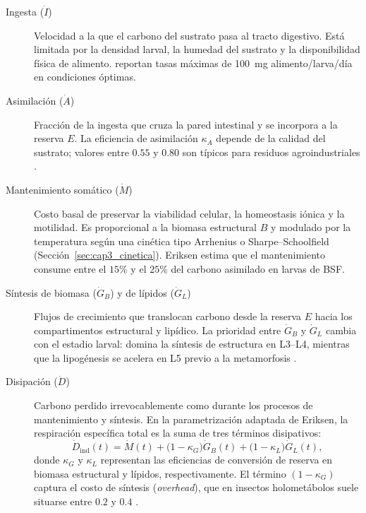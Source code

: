 \begin{description}
    \item[Ingesta ($\dot{I}$)] Velocidad a la que el carbono del sustrato pasa al tracto digestivo. Está limitada por la densidad larval, la humedad del sustrato y la disponibilidad física de alimento. \textcite{dienerConversionOrganicMaterial2011} reportan tasas máximas de 100~mg alimento/larva/día en condiciones óptimas.

    \item[Asimilación ($\dot{A}$)] Fracción de la ingesta que cruza la pared intestinal y se incorpora a la reserva $E$. La eficiencia de asimilación $\kappa_A$ depende de la calidad del sustrato; valores entre $0.55$ y $0.80$ son típicos para residuos agroindustriales \parencite{guillaumeAsymptoticEstimatedDigestibility2023}.

    \item[Mantenimiento somático ($\dot{M}$)] Costo basal de preservar la viabilidad celular, la homeostasis iónica y la motilidad. Es proporcional a la biomasa estructural $B$ y modulado por la temperatura según una cinética tipo Arrhenius o Sharpe--Schoolfield (Sección~\ref{sec:cap3_cinetica}). Eriksen estima que el mantenimiento consume entre el $15\%$ y el $25\%$ del carbono asimilado en larvas de BSF.

    \item[Síntesis de biomasa ($\dot{G}_B$) y de lípidos ($\dot{G}_L$)] Flujos de crecimiento que translocan carbono desde la reserva $E$ hacia los compartimentos estructural y lipídico. La prioridad entre $\dot{G}_B$ y $\dot{G}_L$ cambia con el estadio larval: domina la síntesis de estructura en L3--L4, mientras que la lipogénesis se acelera en L5 previo a la metamorfosis \parencite{eriksenDynamicModellingFeed2022,grausaMetabolicModelingHermetia2023}.

    \item[Disipación ($\dot{D}$)] Carbono perdido irrevocablemente como  durante los procesos de mantenimiento y síntesis. En la parametrización adaptada de Eriksen, la respiración específica total es la suma de tres términos disipativos:
    \begin{equation}
        \dot{D}_{\mathrm{ind}}(t) = \dot{M}(t) + \bigl(1-\kappa_G\bigr)\dot{G}_B(t) + \bigl(1-\kappa_L\bigr)\dot{G}_L(t),
        \label{eq:cap3_disipacion_total}
    \end{equation}
    donde $\kappa_G$ y $\kappa_L$ representan las eficiencias de conversión de reserva en biomasa estructural y lípidos, respectivamente. El término $(1-\kappa_G)$ captura el costo de síntesis (\emph{overhead}), que en insectos holometábolos suele situarse entre $0.2$ y $0.4$ \parencite{nielsenMetabolicPerformanceMealworms2025}.
\end{description}

